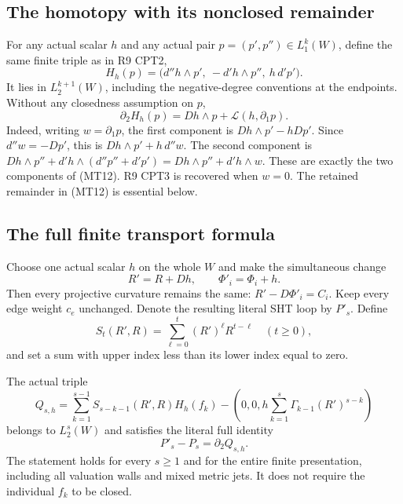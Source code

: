 \subsection{The homotopy with its nonclosed remainder}

For any actual scalar $h$ and any actual pair $p=(p',p'')\in L_1^k(W)$,
define the same finite triple as in R9 CPT2,
\[
 H_h(p)=\bigl(d''h\wedge p',\ -d'h\wedge p'',\ h\,d'p'\bigr).
 \tag{MT11}
\]
It lies in $L_2^{k+1}(W)$, including the negative-degree conventions
at the endpoints.  Without any closedness assumption on $p$,
\[
          \partial_2H_h(p)=Dh\wedge p+
                                  \mathcal L(h,\partial_1p).
 \tag{MT12}
\]
Indeed, writing $w=\partial_1p$, the first component is
$Dh\wedge p'-hDp'$.  Since $d''w=-Dp'$, this is
$Dh\wedge p'+h\,d''w$.  The second component is
$Dh\wedge p''+d'h\wedge(d''p''+d'p')
 =Dh\wedge p''+d'h\wedge w$.  These are exactly the two
components of (MT12).  R9 CPT3 is recovered when $w=0$.
The retained remainder in (MT12) is essential below.

\subsection{The full finite transport formula}

Choose one actual scalar $h$ on the whole $W$ and make the simultaneous
change
\[
          R'=R+Dh,\qquad \Phi'_i=\Phi_i+h.
 \tag{MT13}
\]
Then every projective curvature remains the same:
$R'-D\Phi'_i=C_i$.  Keep every edge weight $c_e$ unchanged.  Denote
the resulting literal SHT loop by $P'_s$.  Define
\[
 S_t(R',R)=\sum_{\ell=0}^t(R')^\ell R^{t-\ell}\quad(t\ge0),
 \tag{MT14}
\]
and set a sum with upper index less than its lower index equal to zero.

\begin{theorem}
The actual triple
\[
 \boxed{\quad
 Q_{s,h}=\sum_{k=1}^{s-1}S_{s-k-1}(R',R)H_h(f_k)
 -\left(0,0,
          h\sum_{k=1}^s\Gamma_{k-1}(R')^{s-k}\right)
 \quad}
 \tag{MT15}
\]
belongs to $L_2^s(W)$ and satisfies the literal full identity
\[
                         P'_s-P_s=\partial_2Q_{s,h}.
 \tag{MT16}
\]
The statement holds for every $s\ge1$ and for the entire finite
presentation, including all valuation walls and mixed metric jets.
It does not require the individual $f_k$ to be closed.
\end{theorem}

